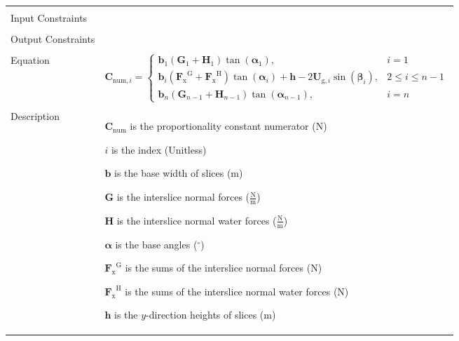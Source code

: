 \documentclass[12pt]{article}
\begin{document}
\begin{minipage}{\textwidth}
\begin{tabular}{>{\raggedright}p{}>{\raggedright\arraybackslash}p{}}
\\ \midrule \\
Input Constraints & 
\\ \midrule \\
Output Constraints & 
\\ \midrule \\
Equation & \begin{displaymath}
           {\symbf{C}_{\text{num},i}}=\begin{cases}
                                      {\symbf{b}}_{1} \left({\symbf{G}}_{1}+{\symbf{H}}_{1}\right) \tan\left({\symbf{α}}_{1}\right), & i=1\\
                                      {\symbf{b}}_{i} \left({{\symbf{F}_{\text{x}}}^{\text{G}}}+{{\symbf{F}_{\text{x}}}^{\text{H}}}\right) \tan\left({\symbf{α}}_{i}\right)+\symbf{h} -2 {\symbf{U}_{\text{g},i}} \sin\left({\symbf{β}}_{i}\right), & 2\leq{}i\leq{}n-1\\
                                      {\symbf{b}}_{n} \left({\symbf{G}}_{n-1}+{\symbf{H}}_{n-1}\right) \tan\left({\symbf{α}}_{n-1}\right), & i=n
                                      \end{cases}
           \end{displaymath}
\\ \midrule \\
Description & \begin{symbDescription}
              \item{${\symbf{C}_{\text{num}}}$ is the proportionality constant numerator (${\text{N}}$)}
              \item{$i$ is the index (Unitless)}
              \item{$\symbf{b}$ is the base width of slices (${\text{m}}$)}
              \item{$\symbf{G}$ is the interslice normal forces ($\frac{\text{N}}{\text{m}}$)}
              \item{$\symbf{H}$ is the interslice normal water forces ($\frac{\text{N}}{\text{m}}$)}
              \item{$\symbf{α}$ is the base angles (${{}^{\circ}}$)}
              \item{${{\symbf{F}_{\text{x}}}^{\text{G}}}$ is the sums of the interslice normal forces (${\text{N}}$)}
              \item{${{\symbf{F}_{\text{x}}}^{\text{H}}}$ is the sums of the interslice normal water forces (${\text{N}}$)}
              \item{$\symbf{h}$ is the $y$-direction heights of slices (${\text{m}}$)}

\end{symbDescription}
\end{tabular}
\end{minipage}
\end{document}
